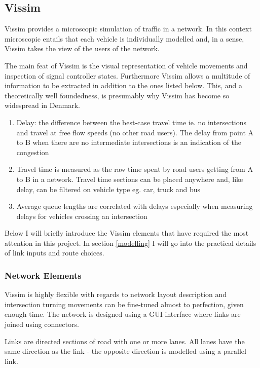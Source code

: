 \subsection*{Vissim}
\label{vissim}
Vissim provides a microscopic simulation of traffic in a network. In this context microscopic entails that each vehicle is individually modelled and, in a sense, Vissim takes the view of the users of the network.

The main feat of Vissim is the visual representation of vehicle movements and inspection of signal controller states. Furthermore Vissim allows a multitude of information to be extracted in addition to the ones listed below. This, and a theoretically well foundedness, is presumably why Vissim has become so widespread in Denmark.

\begin{enumerate}
\item Delay: the difference between the best-case travel time ie. no intersections and travel at free flow speeds (no other road users). The delay from point A to B when there are no intermediate intersections is an indication of the congestion
\item Travel time is measured as the raw time spent by road users getting from A to B in a network. Travel time sections can be placed anywhere and, like delay, can be filtered on vehicle type eg. car, truck and bus
\item Average queue lengths are correlated with delays especially when measuring delays for vehicles crossing an intersection
\end{enumerate}

Below I will briefly introduce the Vissim elements that have required the most attention in this project. In section \ref{modelling} I will go into the practical details of link inputs and route choices.

\subsubsection*{Network Elements}

Vissim is highly flexible with regards to network layout description and intersection turning movements can be fine-tuned almost to perfection, given enough time. The network is designed using a GUI interface where links are joined using connectors.

Links are directed sections of road with one or more lanes. All lanes have the same direction as the link - the opposite direction is modelled using a parallel link.

